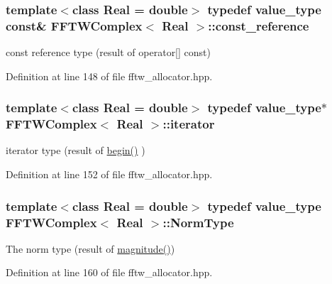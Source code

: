 \hypertarget{class_f_f_t_w_complex_abf193fae52159474a60f7377e5c363e5}{
\subsubsection[{const\-\_\-reference}]{\setlength{\rightskip}{0pt plus 5cm}template$<$class Real = double$>$ typedef {\bf value\-\_\-type} const\& {\bf F\-F\-T\-W\-Complex}$<$ Real $>$\-::{\bf const\-\_\-reference}}}\label{class_f_f_t_w_complex_abf193fae52159474a60f7377e5c363e5}
const reference type (result of operator\mbox{[}\mbox{]} const) 

Definition at line 148 of file fftw\-\_\-allocator.\-hpp.

\hypertarget{class_f_f_t_w_complex_acd25e1e4222dcf20dd6dcdbd38bdb190}{
\subsubsection[{iterator}]{\setlength{\rightskip}{0pt plus 5cm}template$<$class Real = double$>$ typedef {\bf value\-\_\-type}$\ast$ {\bf F\-F\-T\-W\-Complex}$<$ Real $>$\-::{\bf iterator}}}\label{class_f_f_t_w_complex_acd25e1e4222dcf20dd6dcdbd38bdb190}
iterator type (result of \hyperlink{class_f_f_t_w_complex_a57cb222642804fb62a8c75a1e2bae294}{begin()} ) 

Definition at line 152 of file fftw\-\_\-allocator.\-hpp.

\hypertarget{class_f_f_t_w_complex_a32b15a773ea0128be7cecdc7fc49df11}{
\subsubsection[{Norm\-Type}]{\setlength{\rightskip}{0pt plus 5cm}template$<$class Real = double$>$ typedef {\bf value\-\_\-type} {\bf F\-F\-T\-W\-Complex}$<$ Real $>$\-::{\bf Norm\-Type}}}\label{class_f_f_t_w_complex_a32b15a773ea0128be7cecdc7fc49df11}
The norm type (result of \hyperlink{class_f_f_t_w_complex_a03a17d923f2f8d9b9c4ad82d73e5fc97}{magnitude()}) 

Definition at line 160 of file fftw\-\_\-allocator.\-hpp.

